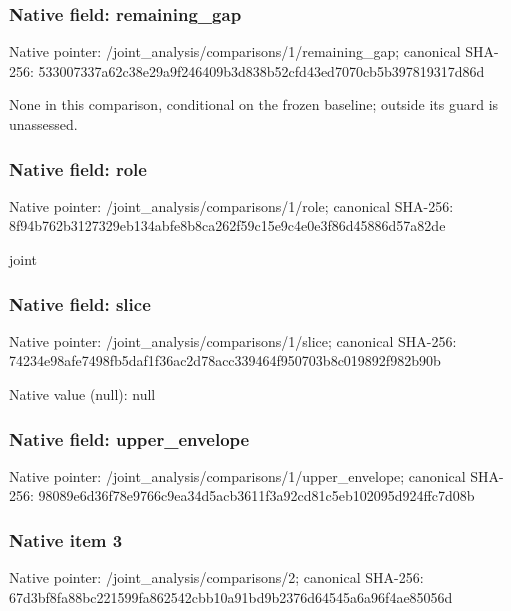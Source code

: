 \documentclass[10pt,a4paper]{article}
\begin{document}
\begingroup\raggedright{}\par\endgroup

\subsubsection{Native field: remaining\_\allowbreak{}gap}
Native pointer: /joint\_\allowbreak{}analysis/comparisons/1/remaining\_\allowbreak{}gap; canonical SHA-256: 533007337a62c38e29a9f246409b3d838b52cfd43ed7070cb5b397819317d86d

\begingroup\raggedright\sloppy None in this comparison,\allowbreak{} conditional on the frozen baseline;\allowbreak{} outside its guard is unassessed.\par\endgroup

\subsubsection{Native field: role}
Native pointer: /joint\_\allowbreak{}analysis/comparisons/1/role; canonical SHA-256: 8f94b762b3127329eb134abfe8b8ca262f59c15e9c4e0e3f86d45886d57a82de

\begingroup\raggedright\sloppy joint\par\endgroup

\subsubsection{Native field: slice}
Native pointer: /joint\_\allowbreak{}analysis/comparisons/1/slice; canonical SHA-256: 74234e98afe7498fb5daf1f36ac2d78acc339464f950703b8c019892f982b90b

Native value (null): null

\subsubsection{Native field: upper\_\allowbreak{}envelope}
Native pointer: /joint\_\allowbreak{}analysis/comparisons/1/upper\_\allowbreak{}envelope; canonical SHA-256: 98089e6d36f78e9766c9ea34d5acb3611f3a92cd81c5eb102095d924ffc7d08b

\begingroup\raggedright{}\par\endgroup

\subsubsection{Native item 3}
Native pointer: /joint\_\allowbreak{}analysis/comparisons/2; canonical SHA-256: 67d3bf8fa88bc221599fa862542cbb10a91bd9b2376d64545a6a96f4ae85056d
\end{document}
